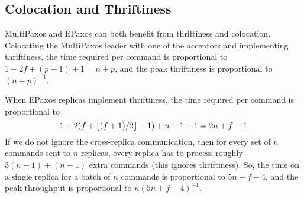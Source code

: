 \subsection{Colocation and Thriftiness}
MultiPaxos and EPaxos can both benefit from thriftiness and colocation.
Colocating the MultiPaxos leader with one of the acceptors and implementing
thriftiness, the time required per command is proportional to $1 + 2f + (p-1) +
1 = n + p$, and the peak thriftiness is proportional to $(n + p)^{-1}$.

When EPaxos replicas implement thriftiness, the time required per command is
proportional to
\[
  1 + 2 (f + \lfloor(f+1)/2\rfloor - 1) + n-1 + 1
  = 2n + f - 1
\]
If we do not ignore the cross-replica communication, then for every set of $n$
commands sent to $n$ replicas, every replica has to process roughly $3(n-1) +
(n-1)$ extra commands (this ignores thriftiness). So, the time on a single
replica for a batch of $n$ commands is proportional to $5n + f - 4$, and the
peak throughput is proportional to $n(5n + f - 4)^{-1}$.
